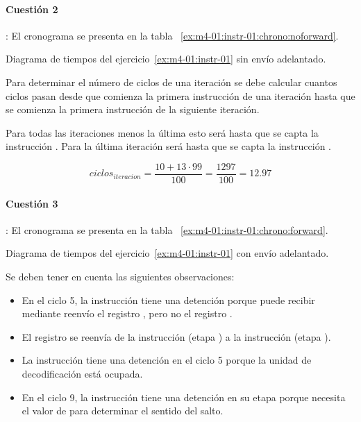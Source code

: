 \paragraph{Cuestión 2}: El cronograma se presenta en la tabla ~\ref{ex:m4-01:instr-01:chrono:noforward}.

\begin{table}[htb]

\caption{Diagrama de tiempos del ejercicio~\ref{ex:m4-01:instr-01} sin envío adelantado.}
\label{ex:m4-01:instr-01:chrono:noforward}
\end{table}

Para determinar el número de ciclos de una iteración se debe calcular cuantos ciclos
pasan desde que comienza la primera instrucción de una iteración hasta que se comienza
la primera instrucción de la siguiente iteración.

Para todas las iteraciones menos la última esto será hasta que se capta la
instrucción . Para la última iteración será hasta que se capta la
instrucción .

\[
ciclos_{iteracion} = \frac{10 + 13 \cdot 99}{100} = \frac{1297}{100} = 12.97
\]

\paragraph{Cuestión 3}: El cronograma se presenta en la tabla ~\ref{ex:m4-01:instr-01:chrono:forward}.

\begin{table}[htb]

\caption{Diagrama de tiempos del ejercicio~\ref{ex:m4-01:instr-01} con envío adelantado.}
\label{ex:m4-01:instr-01:chrono:forward}
\end{table}

Se deben tener en cuenta las siguientes observaciones:
\begin{itemize}

\item En el ciclo 5, la instrucción  tiene una detención
      porque puede recibir mediante reenvío el registro ,
      pero no el registro .

\item El registro  se reenvía de la instrucción 
      (etapa ) a la instrucción  
      (etapa ).

\item La instrucción  tiene una detención en el ciclo 5
      porque la unidad de decodificación está ocupada.

\item En el ciclo 9, la instrucción  tiene una detención
      en su etapa  porque necesita el valor de 
      para determinar el sentido del salto.

\end{itemize}

